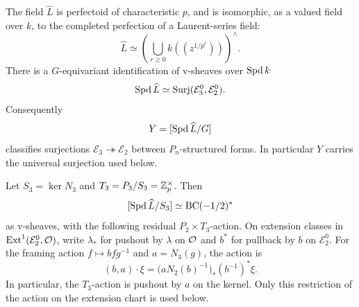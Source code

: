 \begin{proposition}\label{prop:tower}
The field $\widehat L$ is perfectoid of characteristic $p$, and is
isomorphic, as a valued field over $k$, to the completed perfection of a
Laurent-series field:
\[
 \widehat L\simeq
 \left(\bigcup_{r\ge0}k((z^{1/p^r}))\right)^{\wedge}.
\]
There is a $G$-equivariant identification of v-sheaves over $\operatorname{Spd} k$
\[
 \operatorname{Spd}\widehat L\simeq
 \operatorname{Surj}(\mathcal E_3^0,\mathcal E_2^0).
\]
Consequently
\[
 Y=[\operatorname{Spd}\widehat L/G]
\]
classifies surjections $\mathcal E_3\twoheadrightarrow\mathcal E_2$
between $P_n$-structured forms.  In particular $Y$ carries the universal
surjection used below.

Let $S_3=\ker N_3$ and $T_3=P_3/S_3=\mathbb Z_p^{\times}$.  Then
\[
 [\operatorname{Spd}\widehat L/S_3]
 \simeq\operatorname{BC}(-1/2)^*
\]
as v-sheaves, with the following residual $P_2\times T_3$-action.
On extension classes in $\operatorname{Ext}^1(\mathcal E_2^0,\mathcal O)$,
write $\lambda_*$ for pushout by $\lambda$ on $\mathcal O$ and $b^*$ for
pullback by $b$ on $\mathcal E_2^0$.  For the framing action
$f\mapsto bfg^{-1}$ and $a=N_3(g)$, the action is
\[
 (b,a)\cdot\xi
   =\bigl(aN_2(b)^{-1}\bigr)_*(b^{-1})^*\xi.
\]
In particular, the $T_3$-action is pushout by $a$ on the kernel.
Only this restriction of the action on the extension chart is used below.
\end{proposition}

